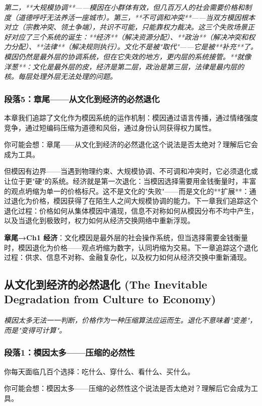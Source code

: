 \documentclass[a4paper,12pt]{book}
\newenvironment{motivation}{\begin{tcolorbox}[colback=gray!10,colframe=gray!60,title=\textit{本章动机},fonttitle=\bfseries,arc=0mm,leftrule=3mm]\small\itshape}{\end{tcolorbox}}
\begin{document}
\begin{motivation}
\begin{motivation}
\begin{motivation}
第二，**大规模协调**——模因在小群体有效，但几百万人的社会需要价格和制度（道德呼吁无法养活一座城市）。第三，**不可调和冲突**——当双方模因根本对立（宗教冲突、领土争端），共识不可能，只能靠权力裁决。这三个失败场景正好对应了三个系统的诞生：**经济**（解决资源分配）、**政治**（解决冲突和权力分配）、**法律**（解决规则执行）。文化不是被"取代"——它是被**补充**了。模因仍然是最外层的协调系统，但在它失效的地方，更内层的系统接管。**就像洋葱**：文化是最外层的皮，经济是第二层，政治是第三层，法律是最内层的核。每层处理外层无法处理的问题。

	\subsubsection*{段落5：章尾——从文化到经济的必然退化}
	本章我们追踪了文化作为模因系统的运作机制：模因通过语言传播，通过情绪强度竞争，通过短编码压缩为道德和风俗，通过身份认同获得权力属性。
	\begin{tcolorbox}[colback=yellow!5, title=\textit{读者行为预测}]
		你可能会想：章尾——从文化到经济的必然退化这个说法是否太绝对？理解后它会成为工具。
	\end{tcolorbox}

但模因有边界——当遇到物理约束、大规模协调、不可调和冲突时，它必须退化或让位于更"硬"的系统。经济就是第一次退化：当模因选择需要用金钱衡量时，丰富的观点坍缩为单一的价格标尺。这不是文化的"失败"——而是文化的**扩展**：通过退化为价格，模因获得了在陌生人之间大规模协调的能力。下一章我们追踪这个退化过程：价格如何从集体模因中涌现，信息不对称如何从模因分布不均中产生，以及当退化到极致时，权力如何从经济交换网络中重新浮现。

	\textbf{章尾→Ch1 经济}：文化模因是最外层的社会操作系统，但当选择需要金钱衡量时，模因退化为价格——观点坍缩为数字，认同坍缩为交易。下一章追踪这个退化过程：供求、信息不对称、金融复杂化，以及权力如何从经济交换中重新涌现。



	\subsection{从文化到经济的必然退化 (The Inevitable Degradation from Culture to Economy)}
	\begin{motivation}
		模因太多无法一一判断，价格作为一种压缩算法应运而生。退化不意味着"变差"，而是"变得可计算"。
	\end{motivation}

	\subsubsection*{段落1：模因太多——压缩的必然性}
	你每天面临几百个选择：吃什么、穿什么、看什么、买什么。
	\begin{tcolorbox}[colback=yellow!5, title=\textit{读者行为预测}]
		你可能会想：模因太多——压缩的必然性这个说法是否太绝对？理解后它会成为工具。
	\end{tcolorbox}


\end{motivation}
\end{motivation}
\end{motivation}
\end{document}
